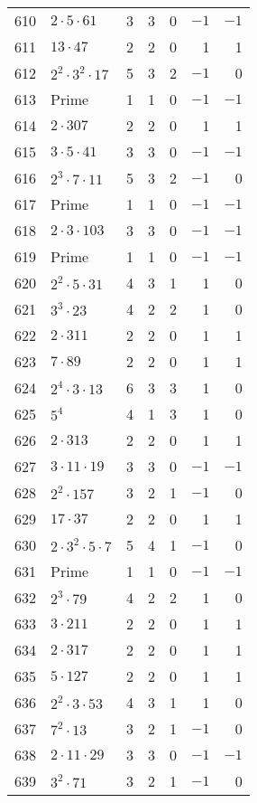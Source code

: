 \documentclass[12pt]{article}
\begin{document}
\begin{tabular}{|r|l|r|r|r|r|r|}
610 & $2 \cdot 5 \cdot 61$ & 3 & 3 & 0 & $-1$ & $-1$ \\
611 & $13 \cdot 47$ & 2 & 2 & 0 & 1 & 1 \\
612 & $2^2 \cdot 3^2 \cdot 17$ & 5 & 3 & 2 & $-1$ & 0 \\
613 & Prime & 1 & 1 & 0 & $-1$ & $-1$ \\
614 & $2 \cdot 307$ & 2 & 2 & 0 & 1 & 1 \\
615 & $3 \cdot 5 \cdot 41$ & 3 & 3 & 0 & $-1$ & $-1$ \\
616 & $2^3 \cdot 7 \cdot 11$ & 5 & 3 & 2 & $-1$ & 0 \\
617 & Prime & 1 & 1 & 0 & $-1$ & $-1$ \\
618 & $2 \cdot 3 \cdot 103$ & 3 & 3 & 0 & $-1$ & $-1$ \\
619 & Prime & 1 & 1 & 0 & $-1$ & $-1$ \\
620 & $2^2 \cdot 5 \cdot 31$ & 4 & 3 & 1 & 1 & 0 \\
621 & $3^3 \cdot 23$ & 4 & 2 & 2 & 1 & 0 \\
622 & $2 \cdot 311$ & 2 & 2 & 0 & 1 & 1 \\
623 & $7 \cdot 89$ & 2 & 2 & 0 & 1 & 1 \\
624 & $2^4 \cdot 3 \cdot 13$ & 6 & 3 & 3 & 1 & 0 \\
625 & $5^4$ & 4 & 1 & 3 & 1 & 0 \\
626 & $2 \cdot 313$ & 2 & 2 & 0 & 1 & 1 \\
627 & $3 \cdot 11 \cdot 19$ & 3 & 3 & 0 & $-1$ & $-1$ \\
628 & $2^2 \cdot 157$ & 3 & 2 & 1 & $-1$ & 0 \\
629 & $17 \cdot 37$ & 2 & 2 & 0 & 1 & 1 \\
630 & $2 \cdot 3^2 \cdot 5 \cdot 7$ & 5 & 4 & 1 & $-1$ & 0 \\
631 & Prime & 1 & 1 & 0 & $-1$ & $-1$ \\
632 & $2^3 \cdot 79$ & 4 & 2 & 2 & 1 & 0 \\
633 & $3 \cdot 211$ & 2 & 2 & 0 & 1 & 1 \\
634 & $2 \cdot 317$ & 2 & 2 & 0 & 1 & 1 \\
635 & $5 \cdot 127$ & 2 & 2 & 0 & 1 & 1 \\
636 & $2^2 \cdot 3 \cdot 53$ & 4 & 3 & 1 & 1 & 0 \\
637 & $7^2 \cdot 13$ & 3 & 2 & 1 & $-1$ & 0 \\
638 & $2 \cdot 11 \cdot 29$ & 3 & 3 & 0 & $-1$ & $-1$ \\
639 & $3^2 \cdot 71$ & 3 & 2 & 1 & $-1$ & 0 \\

\end{tabular}
\end{document}
